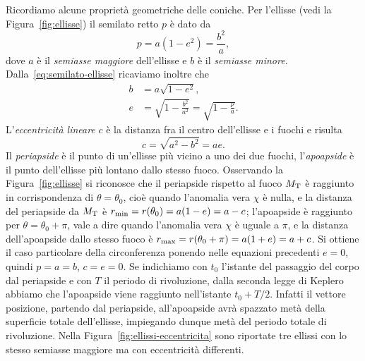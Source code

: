 Ricordiamo alcune proprietà geometriche delle coniche. Per l'ellisse (vedi la
Figura~\ref{fig:ellisse}) il semilato retto $p$ è dato da
\begin{equation}
  \label{eq:semilato-ellisse}
  p = a(1-e^2) = \frac{b^2}{a},
\end{equation}
dove $a$ è il \emph{semiasse maggiore} dell'ellisse e $b$ è il \emph{semiasse
  minore}. Dalla~\eqref{eq:semilato-ellisse} ricaviamo inoltre che
\begin{align}
  b &= a\sqrt{1-e^2}, \label{eq:semiasse-minore-ellisse}\\
  e &= \sqrt{1-\frac{b^2}{a^2}} =
  \sqrt{1-\frac{p}{a}}. \label{eq:eccentricita-ellisse}
\end{align}
L'\emph{eccentricità lineare} $c$ è la distanza fra il centro dell'ellisse e i
fuochi e risulta
\begin{equation}
  c=\sqrt{a^2-b^2} = ae.
\end{equation}
Il \emph{periapside} è il punto di un'ellisse più vicino a uno dei due fuochi,
l'\emph{apoapside} è il punto dell'ellisse più lontano dallo stesso
fuoco. Osservando la Figura~\ref{fig:ellisse} si riconosce che il periapside
rispetto al fuoco $M_\textup{T}$ è raggiunto in corrispondenza di
$\theta=\theta_0$, cioè quando l'anomalia vera $\chi$ è nulla, e la distanza del
periapside da $M_\textup{T}$ è $r_\textup{min} = r(\theta_0) = a(1-e) = a-c$;
l'apoapside è raggiunto per $\theta=\theta_0+\pi$, vale a dire quando l'anomalia
vera $\chi$ è uguale a $\pi$, e la distanza dell'apoapside dallo stesso fuoco è
$r_\textup{max} = r(\theta_0+\pi) = a(1+e)= a+c$. Si ottiene il caso particolare
della circonferenza ponendo nelle equazioni precedenti $e=0$, quindi $p=a=b$,
$c=e=0$. Se indichiamo con $t_0$ l'istante del passaggio del corpo dal
periapside e con $T$ il periodo di rivoluzione, dalla seconda legge di Keplero
abbiamo che l'apoapside viene raggiunto nell'istante $t_0 + T/2$. Infatti il
vettore posizione, partendo dal periapside, all'apoapside avrà spazzato metà
della superficie totale dell'ellisse, impiegando dunque metà del periodo totale
di rivoluzione. Nella Figura~\ref{fig:ellissi-eccentricita} sono riportate tre
ellissi con lo stesso semiasse maggiore ma con eccentricità differenti.
